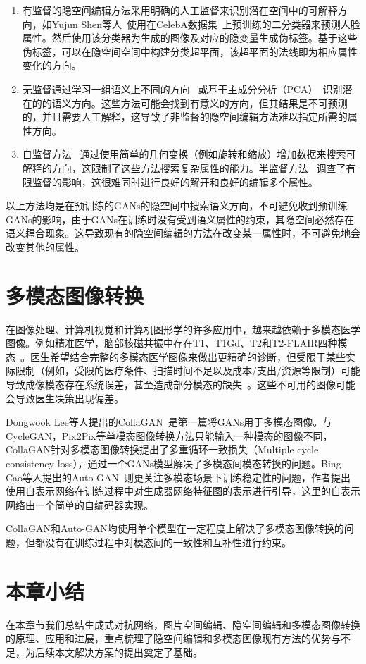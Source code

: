 \begin{enumerate}
\item 有监督的隐空间编辑方法采用明确的人工监督来识别潜在空间中的可解释方向，如Yujun Shen等人~\cite{interfacegan}使用在CelebA数据集~\cite{celeba}上预训练的二分类器来预测人脸属性。然后使用该分类器为生成的图像及对应的隐变量生成伪标签。基于这些伪标签，可以在隐空间空间中构建分类超平面，该超平面的法线即为相应属性变化的方向。

\item 无监督通过学习一组语义上不同的方向~\cite{icml2020} 或基于主成分分析（PCA）~\cite{harkonen2020ganspace}识别潜在的的语义方向。这些方法可能会找到有意义的方向，但其结果是不可预测的，并且需要人工解释，这导致了非监督的隐空间编辑方法难以指定所需的属性方向。

\item 自监督方法~\cite{steer,variation} 通过使用简单的几何变换（例如旋转和缩放）增加数据来搜索可解释的方向，这限制了这些方法搜索复杂属性的能力。半监督方法~\cite{nie2020semi} 调查了有限监督的影响，这很难同时进行良好的解开和良好的编辑多个属性。
\end{enumerate}

以上方法均是在预训练的GANs的隐空间中搜索语义方向，不可避免收到预训练GANs的影响，由于GANs在训练时没有受到语义属性的约束，其隐空间必然存在语义耦合现象。这导致现有的隐空间编辑的方法在改变某一属性时，不可避免地会改变其他的属性。    

\section{多模态图像转换}

在图像处理、计算机视觉和计算机图形学的许多应用中，越来越依赖于多模态医学图像。例如精准医学，脑部核磁共振中存在T1、T1Gd、T2和T2-FLAIR四种模态~\cite{drevelegas2011imaging}。医生希望结合完整的多模态医学图像来做出更精确的诊断，但受限于某些实际限制（例如，受限的医疗条件、扫描时间不足以及成本/支出/资源等限制）可能导致成像模态存在系统误差，甚至造成部分模态的缺失~\cite{tanenbaum2017synthetic}。这些不可用的图像可能会导致医生决策出现偏差。

Dongwook Lee等人提出的CollaGAN~\cite{collagan}是第一篇将GANs用于多模态图像。与CycleGAN，Pix2Pix等单模态图像转换方法只能输入一种模态的图像不同，CollaGAN针对多模态图像转换提出了多重循环一致损失（Multiple cycle consistency loss），通过一个GANs模型解决了多模态间模态转换的问题。Bing Cao等人提出的Auto-GAN~\cite{AutoGAN}则更关注多模态场景下训练稳定性的问题，作者提出使用自表示网络在训练过程中对生成器网络特征图的表示进行引导，这里的自表示网络由一个简单的自编码器实现。

CollaGAN和Auto-GAN均使用单个模型在一定程度上解决了多模态图像转换的问题，但都没有在训练过程中对模态间的一致性和互补性进行约束。

\section{本章小结}

在本章节我们总结生成式对抗网络，图片空间编辑、隐空间编辑和多模态图像转换的原理、应用和进展，重点梳理了隐空间编辑和多模态图像现有方法的优势与不足，为后续本文解决方案的提出奠定了基础。
